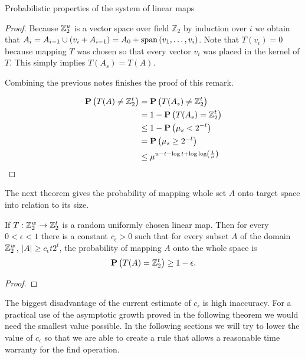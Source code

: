 \begin{section}{Probabilistic properties of the system of linear maps}
\begin{proof}
Because $\mathbb{Z}_{2}^{u}$ is a vector space over field $\mathbb{Z}_2$ by induction over $i$ we obtain that $A_i = A_{i - 1} \cup (v_i + A_{i - 1}) = A_0 + \mathrm{span}\left({v_1, \dots, v_i}\right)$. Note that $T(v_i) = 0$ because mapping $T$ was chosen so that every vector $v_i$ was placed in the kernel of $T$. This simply implies $T(A_s) = T(A)$.

Combining the previous notes finishes the proof of this remark.

\[
\begin{split}
\mathbf{P}\left(T(A) \neq \mathbb{Z}_{2}^{t}\right) 
	& = \mathbf{P}\left(T(A_s) \neq \mathbb{Z}_{2}^{t}\right)  \\
	& = 1 - \mathbf{P}\left(T(A_s) = \mathbb{Z}_{2}^{t}\right) \\
	& \leq 1 - \mathbf{P}\left(\mu_s < 2 ^ {-t}\right) \\
	& = \mathbf{P}\left(\mu_s \geq 2 ^ {-t}\right) \\
	& \leq \mu ^ {u - t - \log t + \log \log \left(\frac{1}{\mu}\right)} \\
\end{split}
\]
\end{proof}

The next theorem gives the probability of mapping whole set $A$ onto target space into relation to its size.
\begin{theorem}
\label{theorem-set-onto-by-linear-transform}
If $T: \mathbb{Z}_{2}^{w} \rightarrow \mathbb{Z}_{2}^{t}$ is a random uniformly chosen linear map. Then for every $0 < \epsilon < 1$ there is a constant $c_\epsilon > 0$ such that for every subset $A$ of the domain $\mathbb{Z}_{2}^{w}$, $|A| \geq c_\epsilon t 2^t$, the probability of mapping $A$ onto the whole space is
\[
	\mathbf{P}\left(T(A) = \mathbb{Z}_{2}^{t}\right) \geq 1 - \epsilon \text{.}
\]
\end{theorem}
\begin{proof}

\end{proof}

The biggest disadvantage of the current estimate of $c_\epsilon$ is high inaccuracy. For a practical use of the asymptotic growth proved in the following theorem we would need the smallest value possible. In the following sections we will try to lower the value of $c_\epsilon$ so that we are able to create a rule that allows a reasonable time warranty for the find operation.
\end{section}
